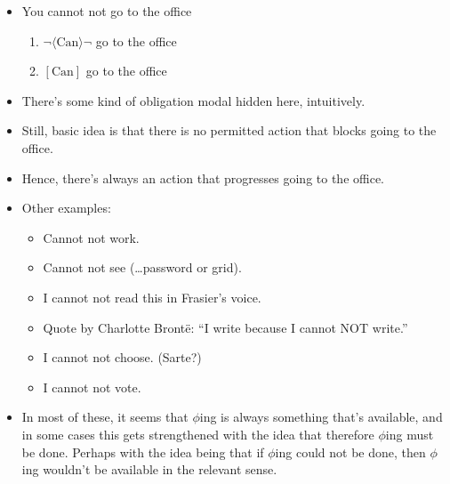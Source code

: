 \documentclass[10pt]{article}
\begin{document}
\begin{itemize}
\item You cannot not go to the office
  \begin{enumerate}
  \item \(\lnot \langle \text{Can} \rangle \lnot\) go to the office
  \item \([\text{Can}]\) go to the office
  \end{enumerate}
\item There's some kind of obligation modal hidden here, intuitively.
\item Still, basic idea is that there is no permitted action that blocks going to the office.
\item Hence, there's always an action that progresses going to the office.
\item Other examples:
  \begin{itemize}
  \item Cannot not work.
  \item Cannot not see (\dots password or grid).
  \item I cannot not read this in Frasier's voice.
  \item Quote by Charlotte Brontë: “I write because I cannot NOT write.”
  \item I cannot not choose. (Sarte?)
  \item I cannot not vote.
  \end{itemize}
\item In most of these, it seems that \(\phi\)ing is always something that's available, and in some cases this gets strengthened with the idea that therefore \(\phi\)ing must be done.
  Perhaps with the idea being that if \(\phi\)ing could not be done, then \(\phi\)ing wouldn't be available in the relevant sense.
\end{itemize}
\end{document}
